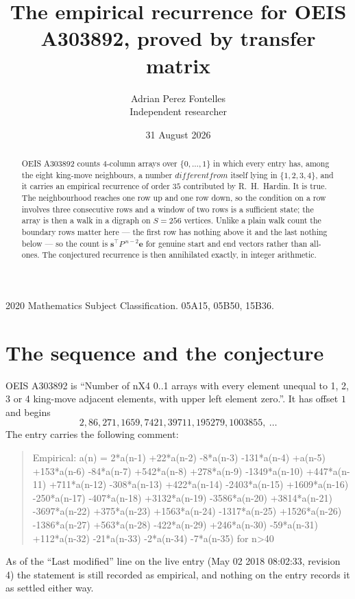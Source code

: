 \documentclass[11pt,a4paper]{article}
\title{The empirical recurrence for OEIS A303892, proved by transfer matrix}
\author{Adrian Perez Fontelles\\ \small Independent researcher}
\date{31 August 2026}
\theoremstyle{plain}
\theoremstyle{definition}
\begin{document}
\maketitle

\begin{abstract}
OEIS A303892 counts $4$-column arrays over $\{0,\dots,1\}$ in which every entry has,
among the eight king-move neighbours, a number $different from$ itself lying in $\{1,2,3,4\}$, and it carries an empirical
recurrence of order $35$ contributed by R.~H.~Hardin. It is true. The neighbourhood
reaches one row up and one row down, so the condition on a row involves three consecutive
rows and a window of two rows is a sufficient state; the array is then a walk in a digraph
on $S=256$ vertices. Unlike a plain walk count the boundary rows matter here --- the first
row has nothing above it and the last nothing below --- so the count is
$\mathbf{s}^{\!\top}P^{\,n-2}\mathbf{e}$ for genuine start and end vectors rather than
all-ones. The conjectured recurrence is then annihilated exactly, in integer arithmetic.
\end{abstract}

\noindent\small 2020 Mathematics Subject Classification. 05A15, 05B50, 15B36.\normalsize

\section{The sequence and the conjecture}

OEIS A303892 is ``Number of nX4 0..1 arrays with every element unequal to 1, 2, 3 or 4 king-move adjacent elements, with upper left element zero.''. It has offset
$1$ and begins
\[
2, 86, 271, 1659, 7421, 39711, 195279, 1003855,\ \dots
\]
The entry carries the following comment:
\begin{quote}\small
Empirical: a(n) = 2*a(n-1) +22*a(n-2) -8*a(n-3) -131*a(n-4) +a(n-5) +153*a(n-6) -84*a(n-7) +542*a(n-8) +278*a(n-9) -1349*a(n-10) +447*a(n-11) +711*a(n-12) -308*a(n-13) +422*a(n-14) -2403*a(n-15) +1609*a(n-16) -250*a(n-17) -407*a(n-18) +3132*a(n-19) -3586*a(n-20) +3814*a(n-21) -3697*a(n-22) +375*a(n-23) +1563*a(n-24) -1317*a(n-25) +1526*a(n-26) -1386*a(n-27) +563*a(n-28) -422*a(n-29) +246*a(n-30) -59*a(n-31) +112*a(n-32) -21*a(n-33) -2*a(n-34) -7*a(n-35) for n>40
\end{quote}
As of the ``Last modified'' line on the live entry (May 02 2018 08:02:33, revision
4) the statement is still recorded as empirical, and nothing on the entry
records it as settled either way.
\end{document}
